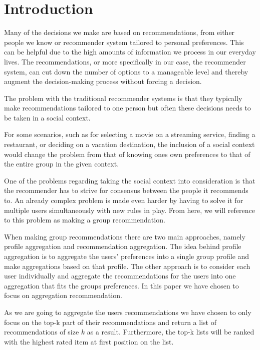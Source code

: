 \section{Introduction}
Many of the decisions we make are based on recommendations, from either people we know or recommender system tailored to personal preferences. This can be helpful due to the high amounts of information we process in our everyday lives\cite{Edwards2001}. The recommendations, or more specifically in our case, the recommender system, can cut down the number of options to a manageable level and thereby augment the decision-making process without forcing a decision.

The problem with the traditional recommender systems is that they typically make recommendations tailored to one person but often these decisions needs to be taken in a social context. 

For some scenarios, such as for selecting a movie on a streaming service, finding a restaurant, or deciding on a vacation destination, the inclusion of a social context would change the problem from that of knowing ones own preferences to that of the entire group in the given context.

One of the problems regarding taking the social context into consideration is that the recommender has to strive for consensus between the people it recommends to. An already complex problem is made even harder by having to solve it for multiple users simultaneously with new rules in play. From here, we will reference to this problem as making a group recommendation.

When making group recommendations there are two main approaches, namely profile aggregation and recommendation aggregation\cite{profilvsrec}. The idea behind profile aggregation is to aggregate the users' preferences into a single group profile and make aggregations based on that profile. The other approach is to consider each user individually and aggregate the recommendations for the users into one aggregation that fits the groups preferences. In this paper we have chosen to focus on aggregation recommendation.


As we are going to aggregate the users recommendations we have chosen to only focus on the top-k part of their recommendations and return a list of recommendations of size $k$ as a result. Furthermore, the top-k lists will be ranked with the highest rated item at first position on the list.

